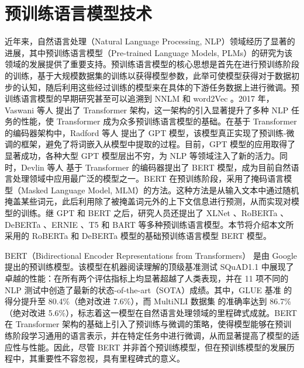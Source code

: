 

\section{预训练语言模型技术}

近年来，自然语言处理（Natural Language Processing, NLP）领域经历了显著的进展，其中预训练语言模型（Pre-trained Language Models, PLMs）的研究为该领域的发展提供了重要支持。预训练语言模型的核心思想是首先在进行预训练阶段的训练，基于大规模数据集的训练以获得模型参数，此举可使模型获得对于数据初步的认知，随后利用这些经过训练的模型来在具体的下游任务数据上进行微调。预训练语言模型的早期研究甚至可以追溯到 NNLM \cite{NNLM} 和 word2Vec \cite{mikolov2013efficientestimationwordrepresentations}。2017 年，Vaswani 等人 \cite{transformer} 提出了 Transformer 架构，这一架构的引入显著提升了多种 NLP 任务的性能，使 Transformer 成为众多预训练语言模型的基础。在基于 Transformer 的编码器架构中，Radford 等人 \cite{gpt} 提出了 GPT 模型，该模型真正实现了预训练-微调的框架，避免了将词嵌入从模型中提取的过程。目前，GPT 模型的应用取得了显著成功，各种大型 GPT 模型层出不穷，为 NLP 等领域注入了新的活力。同时，Devlin 等人 \cite{devlin_bert_2019} 基于 Transformer 的编码器提出了 BERT 模型，成为目前自然语言处理领域中应用最广泛的模型之一。BERT 在预训练阶段，采用了掩码语言模型（Masked Language Model, MLM）的方法。这种方法是从输入文本中通过随机掩盖某些词元，此后利用除了被掩盖词元外的上下文信息进行预测，从而实现对模型的训练。继 GPT 和 BERT 之后，研究人员还提出了 XLNet \cite{XLNet}、RoBERTa \cite{liu_roberta_2019}、DeBERTa \cite{he_deberta_2021}、ERNIE \cite{sun2019ernieenhancedrepresentationknowledge}、T5 \cite{T5} 和 BART \cite{lewis-etal-2020-bart} 等多种预训练语言模型。本节将介绍本文所采用的 RoBERTa 和 DeBERTa 模型的基础预训练语言模型 BERT 模型。

BERT（Bidirectional Encoder Representations from Transformers）\cite{devlin_bert_2019} 是由 Google 提出的预训练模型。该模型在机器阅读理解的顶级基准测试 SQuAD1.1 \cite{rajpurkar2016squad100000questionsmachine} 中展现了卓越的性能：在所有两个评估指标上均显著超越了人类表现，并在 11 项不同的 NLP 测试中创造了最新的状态-of-the-art（SOTA）成绩。其中，GLUE 基准 \cite{wang2019gluemultitaskbenchmarkanalysis} 的得分提升至 80.4\%（绝对改进 7.6\%），而 MultiNLI 数据集 \cite{williams2018broadcoveragechallengecorpussentencemultinli} 的准确率达到 86.7\%（绝对改进 5.6\%），标志着这一模型在自然语言处理领域的里程碑式成就。BERT 在 Transformer 架构的基础上引入了预训练与微调的策略，使得模型能够在预训练阶段学习通用的语言表示，并在特定任务中进行微调，从而显著提高了模型的适应性与性能。因此，尽管 BERT 并非首个预训练模型，但在预训练模型的发展历程中，其重要性不容忽视，具有里程碑式的意义。

